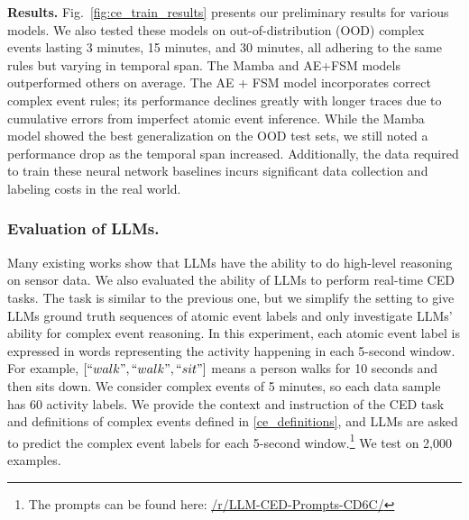 \textbf{Results.} Fig.~\ref{fig:ce_train_results} presents our preliminary results for various models. We also tested these models on out-of-distribution (OOD) complex events lasting 3 minutes, 15 minutes, and 30 minutes, all adhering to the same rules but varying in temporal span. The Mamba and AE+FSM models outperformed others on average. The AE + FSM model incorporates correct complex event rules; its performance declines greatly with longer traces due to cumulative errors from imperfect atomic event inference. While the Mamba model showed the best generalization on the OOD test sets, we still noted a performance drop as the temporal span increased. Additionally, the data required to train these neural network baselines incurs significant data collection and labeling costs in the real world.

\subsubsection{Evaluation of LLMs.}
Many existing works show that LLMs have the ability to do high-level reasoning on sensor data\cite{penAI}\cite{LLMSense}. We also evaluated the ability of LLMs to perform real-time CED tasks. The task is similar to the previous one, but we simplify the setting to give LLMs ground truth sequences of atomic event labels and only investigate LLMs' ability for complex event reasoning. In this experiment,  each atomic event label is expressed in words representing the activity happening in each 5-second window. For example, $[``walk", ``walk", ``sit"]$ means a person walks for 10 seconds and then sits down. We consider complex events of 5 minutes, so each data sample has 60 activity labels. We provide the context and instruction of the CED task and definitions of complex events defined in \ref{ce_definitions}, and LLMs are asked to predict the complex event labels for each 5-second window.\footnote{The prompts can be found here: \href {https://anonymous.4open.science/r/LLM-CED-Prompts-CD6C/}{/r/LLM-CED-Prompts-CD6C/}} We test on 2,000 examples. 



